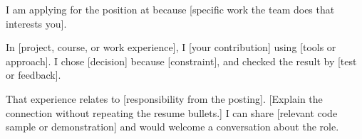 \documentclass{resume}
\begin{document}
\SharedHeader


\begin{letterbody}
I am applying for the \Role position at \Company because [specific work the team does that interests you].

In [project, course, or work experience], I [your contribution] using [tools or approach]. I chose [decision] because [constraint], and checked the result by [test or feedback].

That experience relates to [responsibility from the posting]. [Explain the connection without repeating the resume bullets.] I can share [relevant code sample or demonstration] and would welcome a conversation about the role.
\end{letterbody}

\end{document}
